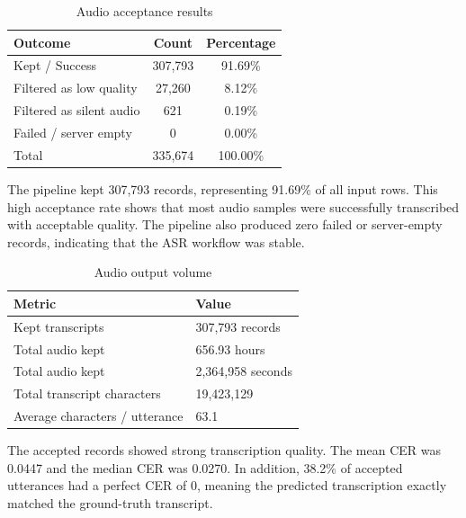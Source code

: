 \documentclass[12pt,oneside,openright,a4paper]{cpe-english-project}
\begin{document}
\begin{table}[H]
\centering
\caption{Audio acceptance results}\label{tbl:audio-accept}
\begin{tabular}{|p{}|c|c|}
\hline
\textbf{Outcome} & \textbf{Count} & \textbf{Percentage} \\ \hline
Kept / Success & 307{,}793 & 91.69\% \\ \hline
Filtered as low quality & 27{,}260 & 8.12\% \\ \hline
Filtered as silent audio & 621 & 0.19\% \\ \hline
Failed / server empty & 0 & 0.00\% \\ \hline
Total & 335{,}674 & 100.00\% \\ \hline
\end{tabular}
\end{table}

The pipeline kept 307{,}793 records, representing 91.69\% of all input rows. This high acceptance rate shows that most audio samples were successfully transcribed with acceptable quality. The pipeline also produced zero failed or server-empty records, indicating that the ASR workflow was stable.

\begin{table}[H]
\centering
\caption{Audio output volume}\label{tbl:audio-volume}
\begin{tabular}{|p{}|p{}|}
\hline
\textbf{Metric} & \textbf{Value} \\ \hline
Kept transcripts & 307{,}793 records \\ \hline
Total audio kept & 656.93 hours \\ \hline
Total audio kept & 2{,}364{,}958 seconds \\ \hline
Total transcript characters & 19{,}423{,}129 \\ \hline
Average characters / utterance & 63.1 \\ \hline
\end{tabular}
\end{table}

The accepted records showed strong transcription quality. The mean CER was 0.0447 and the median CER was 0.0270. In addition, 38.2\% of accepted utterances had a perfect CER of 0, meaning the predicted transcription exactly matched the ground-truth transcript.
\end{document}
